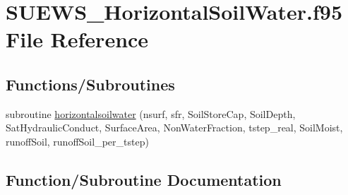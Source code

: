 \hypertarget{_s_u_e_w_s___horizontal_soil_water_8f95}{}\section{S\+U\+E\+W\+S\+\_\+\+Horizontal\+Soil\+Water.\+f95 File Reference}
\label{_s_u_e_w_s___horizontal_soil_water_8f95}
\subsection*{Functions/\+Subroutines}
\begin{DoxyCompactItemize}
\item 
subroutine \hyperlink{_s_u_e_w_s___horizontal_soil_water_8f95_aa5c24f37e4b3d33a10399364e652cab0}{horizontalsoilwater} (nsurf, sfr, Soil\+Store\+Cap, Soil\+Depth, Sat\+Hydraulic\+Conduct, Surface\+Area, Non\+Water\+Fraction, tstep\+\_\+real, Soil\+Moist, runoff\+Soil, runoff\+Soil\+\_\+per\+\_\+tstep)
\end{DoxyCompactItemize}


\subsection{Function/\+Subroutine Documentation}
\mbox{\label{_s_u_e_w_s___horizontal_soil_water_8f95_aa5c24f37e4b3d33a10399364e652cab0}} 
